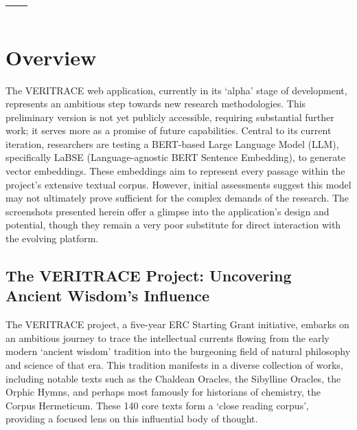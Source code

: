 \documentclass[
  letterpaper,
]{book}
\begin{document}
\chapter{---}\label{section-2}


\chapter*{Overview}\label{overview-2}


The VERITRACE web application, currently in its `alpha' stage of
development, represents an ambitious step towards new research
methodologies. This preliminary version is not yet publicly accessible,
requiring substantial further work; it serves more as a promise of
future capabilities. Central to its current iteration, researchers are
testing a BERT-based Large Language Model (LLM), specifically LaBSE
(Language-agnostic BERT Sentence Embedding), to generate vector
embeddings. These embeddings aim to represent every passage within the
project's extensive textual corpus. However, initial assessments suggest
this model may not ultimately prove sufficient for the complex demands
of the research. The screenshots presented herein offer a glimpse into
the application's design and potential, though they remain a very poor
substitute for direct interaction with the evolving platform.

\section{The VERITRACE Project: Uncovering Ancient Wisdom's
Influence}\label{the-veritrace-project-uncovering-ancient-wisdoms-influence}

The VERITRACE project, a five-year ERC Starting Grant initiative,
embarks on an ambitious journey to trace the intellectual currents
flowing from the early modern `ancient wisdom' tradition into the
burgeoning field of natural philosophy and science of that era. This
tradition manifests in a diverse collection of works, including notable
texts such as the Chaldean Oracles, the Sibylline Oracles, the Orphic
Hymns, and perhaps most famously for historians of chemistry, the Corpus
Hermeticum. These 140 core texts form a `close reading corpus',
providing a focused lens on this influential body of thought.
\end{document}
